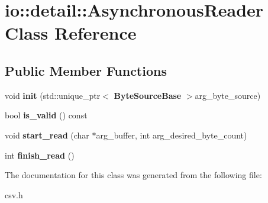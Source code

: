 \section{io\+:\+:detail\+:\+:Asynchronous\+Reader Class Reference}
\label{classio_1_1detail_1_1_asynchronous_reader}
\subsection*{Public Member Functions}
\begin{DoxyCompactItemize}
\item 
void {\bfseries init} (std\+::unique\+\_\+ptr$<$ {\bf Byte\+Source\+Base} $>$arg\+\_\+byte\+\_\+source)\label{classio_1_1detail_1_1_asynchronous_reader_a12ed45f881a671b473d95ded7ad1474c}

\item 
bool {\bfseries is\+\_\+valid} () const \label{classio_1_1detail_1_1_asynchronous_reader_abad9fa88bd5994f4c7a6362138737eb3}

\item 
void {\bfseries start\+\_\+read} (char $\ast$arg\+\_\+buffer, int arg\+\_\+desired\+\_\+byte\+\_\+count)\label{classio_1_1detail_1_1_asynchronous_reader_a9818851dbb994042d0d84183220e71c6}

\item 
int {\bfseries finish\+\_\+read} ()\label{classio_1_1detail_1_1_asynchronous_reader_a94520530423e9bfeb04c23ea4e3a8786}

\end{DoxyCompactItemize}


The documentation for this class was generated from the following file\+:\begin{DoxyCompactItemize}
\item 
csv.\+h\end{DoxyCompactItemize}
